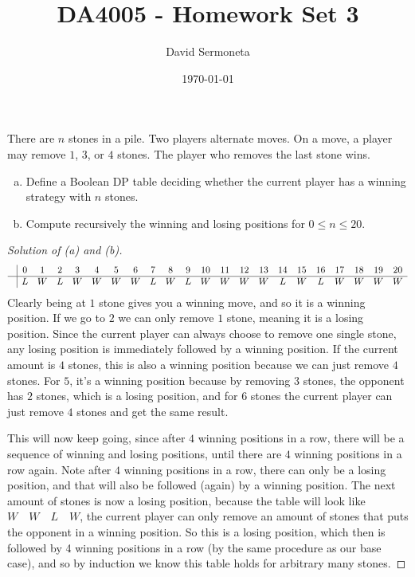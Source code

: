 \documentclass[11pt,a4paper]{article}
\title{DA4005 - Homework Set 3}
\author{David Sermoneta}
\date{\today}
\begin{document}
\maketitle
\begin{assignment}
There are $n$ stones in a pile. Two players alternate moves. On a move, a player may remove $1$, $3$, or $4$ stones. The player who removes the last stone wins.
\begin{enumerate}[(a)]
\item Define a Boolean DP table deciding whether the current player has a winning strategy with $n$ stones.
\item Compute recursively the winning and losing positions for $0\leq n\leq 20$.
\end{enumerate}
\begin{proof}[Solution of (a) and (b)] 
\[
\begin{array}{c|ccccccccccccccccccccc}
 & 0 & 1 & 2 & 3 & 4 & 5 & 6 & 7 & 8 & 9 & 10 & 11 & 12 & 13 & 14 & 15 & 16 & 17 & 18 & 19 & 20 \\
\hline
 & L  & W & L & W & W & W & W & L & W & L & W  &  W & W  & W  & L  & W  & L  & W  & W  & W  & W  \\
\end{array}
\] 
Clearly being at $1$ stone gives you a winning move, and so it is a winning
position. If we go to $2$ we can only remove $1$ stone, meaning it is a losing
position. Since the current player can always choose to remove one single
stone, any losing position is immediately followed by a winning position. If
the current amount is $4$ stones, this is also a winning position because we
can just remove $4$ stones.  For $5$, it's  a winning position because by
removing $3$ stones, the opponent has $2$ stones, which is a losing position,
and for $6$ stones the current player can just remove $4$ stones and get the
same result.
 
This will now keep going, since after $4$ winning positions in a row, there
will be a sequence of winning and losing positions, until there are $4$
winning positions in a row again. Note after $4$ winning positions in a row, there
can only be a losing position, and that will also be followed (again) by a winning position. The next amount of stones is now a losing position, because the table will look like $W \quad W \quad L \quad W$, the current player can only remove an amount of stones that puts the opponent in a winning position. So this is a losing position, which then is followed by 4 winning positions in a row (by the same procedure as our base case), and so by induction we know this table holds for arbitrary many stones.
\end{proof}
\end{assignment}
\end{document}
